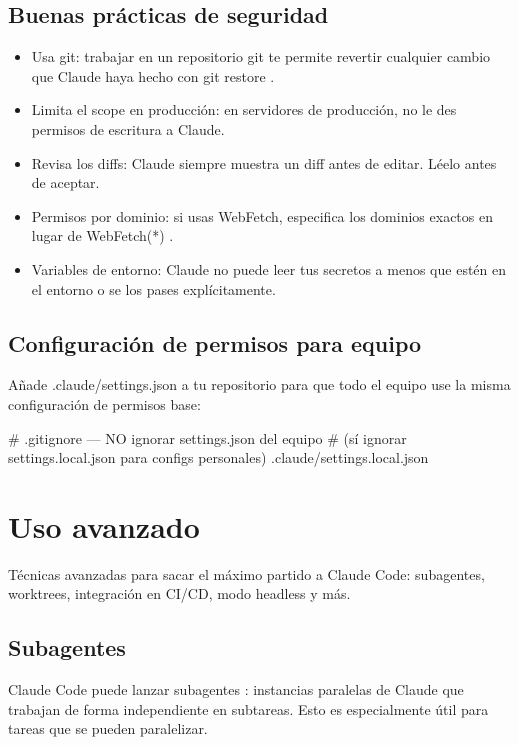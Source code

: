 \documentclass[11pt,a4paper]{book}
\begin{document}
\section{Buenas prácticas de seguridad}
\begin{itemize}\item Usa git: trabajar en un repositorio git te permite revertir cualquier cambio que Claude haya hecho con git restore .\end{itemize}
\begin{itemize}\item Limita el scope en producción: en servidores de producción, no le des permisos de escritura a Claude.\end{itemize}
\begin{itemize}\item Revisa los diffs: Claude siempre muestra un diff antes de editar. Léelo antes de aceptar.\end{itemize}
\begin{itemize}\item Permisos por dominio: si usas WebFetch, especifica los dominios exactos en lugar de WebFetch(*) .\end{itemize}
\begin{itemize}\item Variables de entorno: Claude no puede leer tus secretos a menos que estén en el entorno o se los pases explícitamente.\end{itemize}
\section{Configuración de permisos para equipo}
Añade .claude/settings.json a tu repositorio para que todo el equipo use la misma configuración de permisos base:

\begin{codebox}
# .gitignore — NO ignorar settings.json del equipo
# (sí ignorar settings.local.json para configs personales)
.claude/settings.local.json
\end{codebox}
\chapter{Uso avanzado}
Técnicas avanzadas para sacar el máximo partido a Claude Code: subagentes, worktrees, integración en CI/CD, modo headless y más.

\section{Subagentes}
Claude Code puede lanzar subagentes : instancias paralelas de Claude que trabajan de forma independiente en subtareas. Esto es especialmente útil para tareas que se pueden paralelizar.
\end{document}
